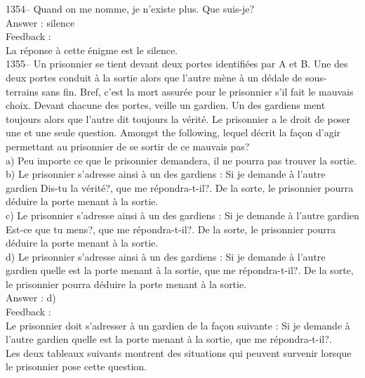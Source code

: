 \documentclass[letterpaper, 12pt]{article}
\begin{document}
1354-- Quand on me nomme, je n'existe plus.  Que suis-je?\\

Answer : silence\\

Feedback : \\
La r\'eponse \`a cette \'enigme est le silence.\\

1355-- Un prisonnier se tient devant deux portes identifi\'ees par A et B.
Une des deux portes conduit \`a la sortie alors que l'autre m\`ene \`a un
d\'edale de sous-terrains sans fin.  Bref, c'est la mort assur\'ee pour le
prisonnier s'il fait le mauvais choix. Devant chacune des portes, veille un
gardien.  Un des gardiens ment toujours alors que l'autre dit toujours la
v\'erit\'e.  Le prisonnier a le droit de poser une et une seule question.
Amongst the following, lequel d\'ecrit la fa\c con d'agir
permettant au prisonnier de se sortir de ce mauvais pas?\\
a) Peu importe ce que le prisonnier demandera, il ne pourra pas trouver la
sortie.\\
b) Le prisonnier s'adresse ainsi \`a un des gardiens : \og Si je
demande \`a l'autre gardien \og Dis-tu la v\'erit\'e?\fg , que me
r\'epondra-t-il?\fg . De la
sorte, le prisonnier pourra d\'eduire la porte menant \`a la sortie.\\
c) Le prisonnier s'adresse ainsi \`a un des gardiens : \og Si je
demande \`a l'autre gardien \og Est-ce que tu mens?\fg , que me
r\'epondra-t-il?\fg . De la
sorte, le prisonnier pourra d\'eduire la porte menant \`a la sortie.\\
d) Le prisonnier s'adresse ainsi \`a un des gardiens : \og Si je
demande \`a l'autre gardien quelle est la porte menant \`a la
sortie, que me r\'epondra-t-il?\fg . De la sorte, le prisonnier
pourra d\'eduire la porte
menant \`a la sortie.\\

Answer : d)\\

Feedback : \\
Le prisonnier doit s'adresser \`a un gardien de la fa\c con suivante
: \og Si je demande \`a l'autre gardien
quelle est la porte menant \`a la sortie, que me r\'epondra-t-il?\fg .\\
Les deux tableaux suivants montrent des situations qui peuvent survenir
lorsque le prisonnier pose cette question.  \\
\end{document}
